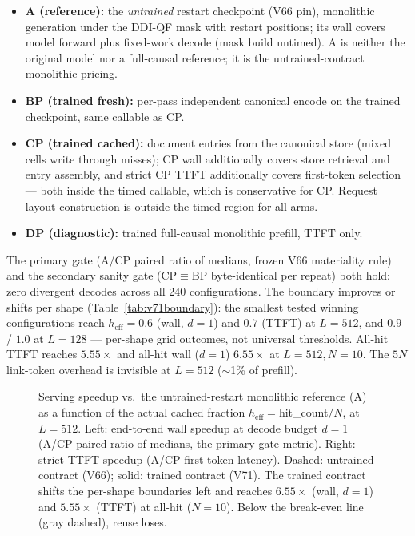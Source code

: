 \begin{itemize}
\item \textbf{A (reference):} the \emph{untrained} restart checkpoint
(V66 pin), monolithic generation under the DDI-QF mask with restart
positions; its wall covers model forward plus fixed-work decode (mask build
untimed). A is neither the original model nor a full-causal reference; it is
the untrained-contract monolithic pricing.
\item \textbf{BP (trained fresh):} per-pass independent canonical encode on
the trained checkpoint, same callable as CP.
\item \textbf{CP (trained cached):} document entries from the canonical
store (mixed cells write through misses); CP wall additionally covers store
retrieval and entry assembly, and strict CP TTFT additionally covers
first-token selection --- both inside the timed callable, which is
conservative for CP. Request layout construction is outside the timed
region for all arms.
\item \textbf{DP (diagnostic):} trained full-causal monolithic prefill,
TTFT only.
\end{itemize}

The primary gate (A/CP paired ratio of medians, frozen V66 materiality
rule) and the secondary sanity gate (CP$\equiv$BP byte-identical per
repeat) both hold: zero divergent decodes across all 240 configurations.
The boundary improves or shifts per shape
(Table~\ref{tab:v71boundary}): the smallest tested winning configurations
reach $h_{\mathrm{eff}}{=}0.6$ (wall, $d{=}1$) and $0.7$ (TTFT) at
$L{=}512$, and $0.9$ / $1.0$ at $L{=}128$ --- per-shape grid outcomes, not
universal thresholds. All-hit TTFT reaches $5.55\times$ and all-hit wall
($d{=}1$) $6.55\times$ at $L{=}512,N{=}10$. The $5N$ link-token overhead is
invisible at $L{=}512$ ($\sim$1\% of prefill).

\begin{table}[H]
\centering\footnotesize
\caption{Serving boundary per shape, untrained (V66) vs.\ trained (V71)
contract, as smallest tested winning $h_{\mathrm{eff}}{=}$hit\_count$/N$
under the frozen materiality rule. Smaller is better; ---{} = none in the
frozen grid. Grid-specific, not universal thresholds.}
\label{tab:v71boundary}
\end{table}

\begin{figure}[H]
\centering

\caption{Serving speedup vs.\ the untrained-restart monolithic reference
(A) as a function of the actual cached fraction
$h_{\mathrm{eff}}{=}$hit\_count$/N$, at $L{=}512$. Left: end-to-end wall
speedup at decode budget $d{=}1$ (A/CP paired ratio of medians, the primary
gate metric). Right: strict TTFT speedup (A/CP first-token latency). Dashed:
untrained contract (V66); solid: trained contract (V71). The trained
contract shifts the per-shape boundaries left and reaches $6.55\times$
(wall, $d{=}1$) and $5.55\times$ (TTFT) at all-hit ($N{=}10$). Below the
break-even line (gray dashed), reuse loses.}
\label{fig:crossover512}
\end{figure}

